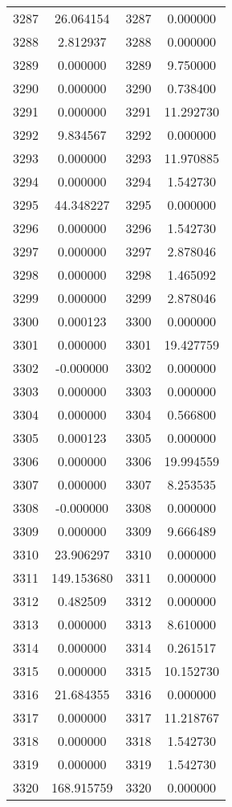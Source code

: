 \documentclass[12pt]{article}
\begin{document}
\begin{longtable}{@{}cccc@{}}
3287 & 26.064154 & 3287 & 0.000000 \\
3288 & 2.812937 & 3288 & 0.000000 \\
3289 & 0.000000 & 3289 & 9.750000 \\
3290 & 0.000000 & 3290 & 0.738400 \\
3291 & 0.000000 & 3291 & 11.292730 \\
3292 & 9.834567 & 3292 & 0.000000 \\
3293 & 0.000000 & 3293 & 11.970885 \\
3294 & 0.000000 & 3294 & 1.542730 \\
3295 & 44.348227 & 3295 & 0.000000 \\
3296 & 0.000000 & 3296 & 1.542730 \\
3297 & 0.000000 & 3297 & 2.878046 \\
3298 & 0.000000 & 3298 & 1.465092 \\
3299 & 0.000000 & 3299 & 2.878046 \\
3300 & 0.000123 & 3300 & 0.000000 \\
3301 & 0.000000 & 3301 & 19.427759 \\
3302 & -0.000000 & 3302 & 0.000000 \\
3303 & 0.000000 & 3303 & 0.000000 \\
3304 & 0.000000 & 3304 & 0.566800 \\
3305 & 0.000123 & 3305 & 0.000000 \\
3306 & 0.000000 & 3306 & 19.994559 \\
3307 & 0.000000 & 3307 & 8.253535 \\
3308 & -0.000000 & 3308 & 0.000000 \\
3309 & 0.000000 & 3309 & 9.666489 \\
3310 & 23.906297 & 3310 & 0.000000 \\
3311 & 149.153680 & 3311 & 0.000000 \\
3312 & 0.482509 & 3312 & 0.000000 \\
3313 & 0.000000 & 3313 & 8.610000 \\
3314 & 0.000000 & 3314 & 0.261517 \\
3315 & 0.000000 & 3315 & 10.152730 \\
3316 & 21.684355 & 3316 & 0.000000 \\
3317 & 0.000000 & 3317 & 11.218767 \\
3318 & 0.000000 & 3318 & 1.542730 \\
3319 & 0.000000 & 3319 & 1.542730 \\
3320 & 168.915759 & 3320 & 0.000000 \\

\end{longtable}
\end{document}

